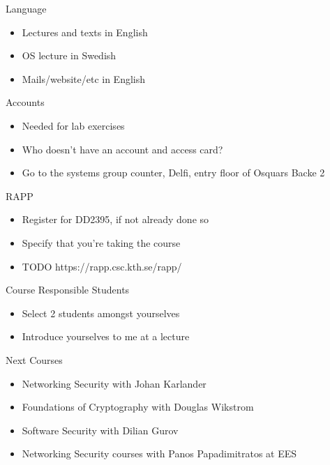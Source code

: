 \documentclass{beamer}
\newcommand{\todo}[1]{\alert{TODO #1}}
\begin{document}
\begin{frame}{Language}
  \begin{itemize}
  \item Lectures and texts in English
  \item OS lecture in Swedish
  \item Mails/website/etc in English
  \end{itemize}
\end{frame}

\begin{frame}{Accounts}
  \begin{itemize}
  \item Needed for lab exercises
  \item Who doesn't have an account and access card?
  \item Go to the systems group counter, Delfi, entry 
floor of Osquars Backe 2
  \end{itemize}
\end{frame}

\begin{frame}{RAPP}
  \begin{itemize}
    \item Register for DD2395, if not already done so 
    \item Specify that you're taking the course 
    \item \todo{https://rapp.csc.kth.se/rapp/}
  \end{itemize}
\end{frame}
 
\begin{frame}{Course Responsible Students }
  \begin{itemize}
  \item Select 2 students amongst yourselves 
  \item Introduce yourselves to me at a lecture 
  \end{itemize}
\end{frame}


\begin{frame}{Next Courses}
  \begin{itemize}
  \item Networking Security with Johan Karlander
  \item Foundations of Cryptography with Douglas Wikstr\:om
  \item Software Security with Dilian Gurov
  \item Networking Security courses with Panos
    Papadimitratos at EES
  \end{itemize}
\end{frame}
\end{document}
